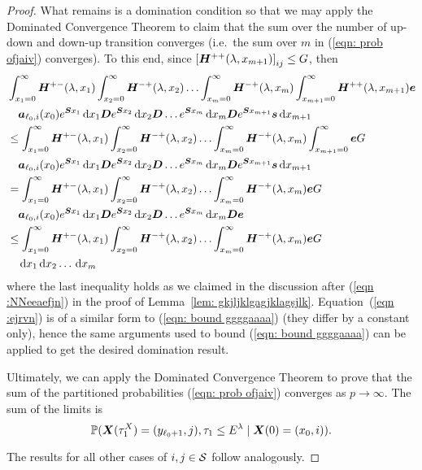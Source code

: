\begin{proof}
	What remains is a domination condition so that we may apply the Dominated Convergence Theorem to claim that the sum over the number of up-down and down-up transition converges (i.e.~the sum over \(m\) in (\ref{eqn: prob ofjaiv}) converges). To this end, since \(\left[\boldsymbol H^{++}(\lambda,x_{m+1})\right]_{ij}\leq G\), then 
	\begin{align}
			&\int_{x_1=0}^\infty \boldsymbol H^{+-}(\lambda,x_1)\nonumber
		\int_{x_2=0}^\infty \boldsymbol H^{-+}(\lambda,x_2) 
		\hdots \int_{x_m=0}^\infty \boldsymbol H^{-+}(\lambda, x_m) 
		\int_{x_{m+1}=0}^\infty \boldsymbol H^{++}(\lambda,x_{m+1}) \boldsymbol e 
		\\&\quad\boldsymbol   a_{\ell_0,i}(x_0)e^{\boldsymbol{S}x_1}\, \mathrm{d} x_1 \boldsymbol{D}e^{\boldsymbol{S}x_2} \, \mathrm{d} x_2 \boldsymbol{D}\dots e^{\boldsymbol{S}x_m} \, \mathrm{d} x_m \boldsymbol{D}e^{\boldsymbol{S}x_{m+1}}{\boldsymbol s} \, \mathrm{d} x_{m+1}\nonumber 
			\\&\leq \int_{x_1=0}^\infty \boldsymbol H^{+-}(\lambda,x_1)\nonumber
		\int_{x_2=0}^\infty \boldsymbol H^{-+}(\lambda,x_2) 
		\hdots \int_{x_m=0}^\infty \boldsymbol H^{-+}(\lambda, x_m) 
		\int_{x_{m+1}=0}^\infty \boldsymbol e G
		\\&\quad\boldsymbol   a_{\ell_0,i}(x_0)e^{\boldsymbol{S}x_1}\, \mathrm{d} x_1 \boldsymbol{D}e^{\boldsymbol{S}x_2} \, \mathrm{d} x_2 \boldsymbol{D}\dots e^{\boldsymbol{S}x_m} \, \mathrm{d} x_m \boldsymbol{D}e^{\boldsymbol{S}x_{m+1}}{\boldsymbol s} \, \mathrm{d} x_{m+1}\nonumber
		\\&=\int_{x_1=0}^\infty \boldsymbol H^{+-}(\lambda,x_1)\nonumber
		\int_{x_2=0}^\infty \boldsymbol H^{-+}(\lambda,x_2) 
		\hdots \int_{x_m=0}^\infty \boldsymbol H^{-+}(\lambda, x_m) 
		 \boldsymbol e G
		\\&\quad\boldsymbol   a_{\ell_0,i}(x_0)e^{\boldsymbol{S}x_1}\, \mathrm{d} x_1 \boldsymbol{D}e^{\boldsymbol{S}x_2} \, \mathrm{d} x_2 \boldsymbol{D}\dots e^{\boldsymbol{S}x_m} \, \mathrm{d} x_m \boldsymbol{D}{\boldsymbol e}\nonumber
			\\&\leq\int_{x_1=0}^\infty \boldsymbol H^{+-}(\lambda,x_1)\nonumber
		\int_{x_2=0}^\infty \boldsymbol H^{-+}(\lambda,x_2) 
		\hdots \int_{x_m=0}^\infty \boldsymbol H^{-+}(\lambda, x_m) 
		 \boldsymbol e G
		\\&\quad \, \mathrm{d} x_1 \, \mathrm{d} x_2\dots \, \mathrm{d} x_m \label{eqn :ejrvn}
	\end{align}
	where the last inequality holds as we claimed in the discussion after (\ref{eqn :NNeeaefjn}) in the proof of Lemma~\ref{lem: gkjljklgagjklagsjlk}. Equation~(\ref{eqn :ejrvn}) is of a similar form to (\ref{eqn: bound ggggaaaa}) (they differ by a constant only), hence the same arguments used to bound (\ref{eqn: bound ggggaaaa}) can be applied to get the desired domination result. 
	
	Ultimately, we can apply the Dominated Convergence Theorem to prove that the sum of the partitioned probabilities (\ref{eqn: prob ofjaiv}) converges as \(p\to\infty\). The sum of the limits is 
	\[\mathbb P(\boldsymbol X(\tau_1^X) = (y_{\ell_0+1}, j), \tau_{1}\leq E^\lambda 
            	 \mid \boldsymbol X(0) = (x_0,i)).\]
	 
	 The results for all other cases of \(i,j\in\mathcal{S}\) follow analogously.
\end{proof}